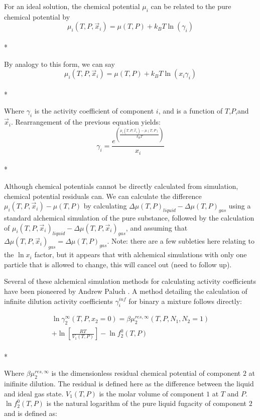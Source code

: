 \documentclass[9pt,bestpractices]{livecoms}
\begin{document}
For an ideal solution, the chemical potential $\mu_i$ can be related to the pure chemical potential by 
\begin{equation}\mu_{i}(T,P,\vec{x}_i) = \mu(T,P) + k_B T \ln\left(\gamma_i\right)\end{equation}\\*

By analogy to this form, we can say 
\begin{equation}\mu_{i}(T,P,\vec{x}_i) = \mu(T,P) + k_B T \ln\left(x_i \gamma_i\right)\end{equation}\\*

Where $\gamma_i$ is the activity coefficient of component $i$, and is
a function of $T$,$P$,and $\vec{x}_i$.  Rearrangement of the previous
equation yields:
\begin{equation}\gamma_i = \frac{e^{\left(\frac{\mu_i(T,P,\vec{x}_i) - \mu(T,P)}{k_B T}\right)}}{x_i}\end{equation}\\*

Although chemical potentials cannot be directly calculated from
simulation, chemical potential residuals can. We can calculate the
difference $\mu_i(T,P,\vec{x}_i) - \mu(T,P)$ by calculating $\Delta
\mu(T,P)_{liquid} - \Delta \mu(T,P)_{gas}$ using a standard alchemical
simulation of the pure substance, followed by the calculation of
$\mu_i(T,P,\vec{x}_i)_{liquid} - \Delta \mu(T,P,\vec{x}_i)_{gas}$, and
assuming that $\Delta \mu(T,P,\vec{x}_i)_{gas} = \Delta
\mu(T,P)_{gas}$. Note: there are a few subleties here relating to the
$\ln x_i$ factor, but it appears that with alchemical simulations with
only one particle that is allowed to change, this will cancel out
(need to follow up).

Several of these alchemical simulation methods for calculating activity coefficients have been pioneered by Andrew Paluch \cite{paluch1}. A method detailing the calculation of infinite dilution activity coefficients $\gamma_i^{inf}$ for binary a mixture follows directly:

\begin{multline}
\ln\gamma_2^{\infty}\left(T,P,x_2 = 0\right) = \beta \mu_2^{res,\infty}\left(T,P,N_1,N_2 = 1\right) \\ + \ln\left[\frac{R T}{V_1\left(T,P\right)}\right] - \ln f_2^0\left(T,P\right)
\end{multline}\\*

Where $\beta\mu_2^{res,\infty}$ is the dimensionless residual chemical potential of component $2$ at inifinite dilution. The residual is defined here as the difference between the liquid and ideal gas state. $V_1\left(T,P\right)$ is the molar volume of component $1$ at $T$ and $P$. $\ln f_2^0\left(T,P\right)$ is the natural logarithm of the pure liquid fugacity of component $2$ and is defined as:
\end{document}
